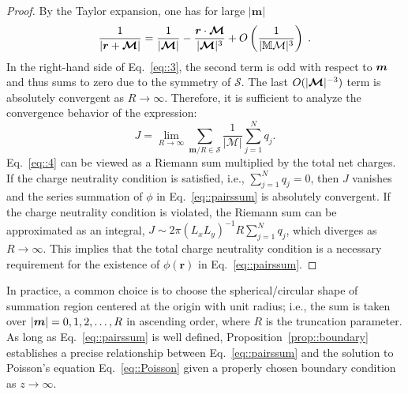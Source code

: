 \begin{proof}
	By the Taylor expansion, one has for large $|\bm{m}|$
	\begin{equation}\label{eq::3}
		\frac{1}{|\bm{r} + \bm{\mathcal{M}}|} = \frac{1}{|\bm{\mathcal{M}}|} - \frac{\bm{r} \cdot \bm{\mathcal{M}}}{|\bm{\mathcal{M}}|^3} + O \left(\frac{1}{|\mathcal{\mathbb{M} M}|^3}\right)\;.
	\end{equation}
	In the right-hand side of Eq.~\eqref{eq::3}, the second term is odd with respect to $\boldsymbol{m}$ and thus sums to zero due to the symmetry of $\mathcal{S}$. The last $O(|\boldsymbol{\mathcal{M}}|^{-3})$ term is absolutely convergent as $R\rightarrow \infty$. Therefore, it is sufficient to analyze the convergence behavior of the expression:
	\begin{equation}\label{eq::4}
        J=\lim_{R\rightarrow\infty}\sum_{\bm{m}/ R \in \mathcal{S}}\frac{1}{|\bm{\mathcal{M}}|}\sum_{j=1}^{N}q_{j}.
	\end{equation}
	Eq.~\eqref{eq::4} can be viewed as a Riemann sum multiplied by the total net charges. If the charge neutrality condition is satisfied, i.e., $\sum_{j=1}^{N}q_{j}=0$, then $J$ vanishes and the series summation of $\phi$ in Eq.~\eqref{eq::pairssum} is absolutely convergent. 
	If the charge neutrality condition is violated, the Riemann sum can be approximated as an integral, $J\sim 2\pi (L_xL_y)^{-1} R\sum_{j=1}^{N}q_{j}$, which diverges as $R\rightarrow \infty$. This implies that the total charge neutrality condition is a necessary requirement for the existence of $\phi(\bm{r})$ in Eq.~\eqref{eq::pairssum}.
\end{proof}

In practice, a common choice is to choose the spherical/circular shape of summation region centered at the origin with unit radius; i.e., the sum is taken over $\lvert\boldsymbol{m}\rvert=0, 1, 2, \ldots, R$ in ascending order, where $R$ is the truncation parameter.
As long as Eq.~\eqref{eq::pairssum} is well defined, Proposition~\ref{prop::boundary} establishes a precise relationship between Eq.~\eqref{eq::pairssum} and the solution to Poisson's equation Eq.~\eqref{eq::Poisson} given a properly chosen boundary condition as $z\to\infty$.

